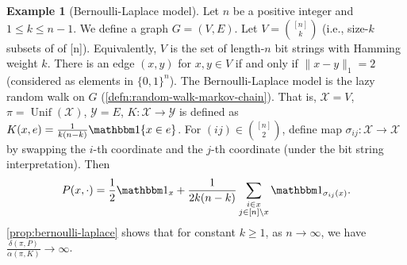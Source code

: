 \documentclass[11pt]{article}
\def\cX{\mathcal{X}}
\def\cY{\mathcal{Y}}
\DeclareMathOperator\Unif{\mathrm{Unif}}
\theoremstyle{definition}
\newtheorem{example}[theorem]{Example}
\begin{document}
\begin{example}[Bernoulli-Laplace model] \label{ex:bernoulli-laplace}
  Let $n$ be a positive integer and $1\le k\le n-1$.
  We define a graph $G=(V,E)$.
  Let $V=\binom{[n]}k$ (i.e., size-$k$ subsets of of [n]).
  Equivalently, $V$ is the set of length-$n$ bit strings with Hamming weight $k$.
  There is an edge $(x,y)$ for $x,y\in V$ if and only if $\|x-y\|_1 = 2$ (considered as elements in $\{0,1\}^n$).
  The Bernoulli-Laplace model is the lazy random walk on $G$ (\cref{defn:random-walk-markov-chain}).
  That is, $\cX=V$, $\pi=\Unif(\cX)$, $\cY=E$, $K: \cX \to \cY$ is defined as $K(x,e)=\frac 1{k(n-k)} \mathbbm1\{x\in e\}$.
  For $(ij)\in \binom{[n]}{2}$, define map $\sigma_{ij}: \cX \to \cX$ by swapping the $i$-th coordinate and the $j$-th coordinate (under the bit string interpretation).
  Then
  \begin{align}
    P(x,\cdot) = \frac 12 \mathbbm1_{x} + \frac 1{2k(n-k)} \sum_{\substack{i\in x \\ j\in [n]\backslash x}} \mathbbm 1_{\sigma_{ij}(x)}.
  \end{align}
  \cref{prop:bernoulli-laplace} shows that for constant $k\ge 1$, as $n\to \infty$, we have $\frac{\delta(\pi, P)}{\alpha(\pi, K)}\to \infty$.
\end{example}
\end{document}
